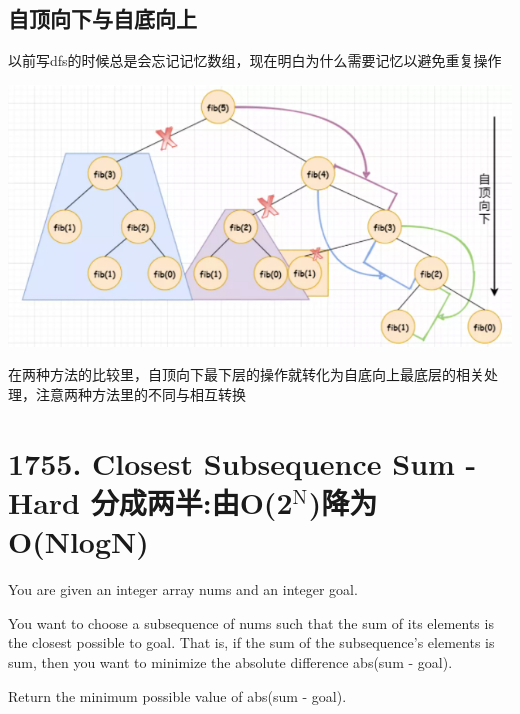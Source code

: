 \documentclass[9pt, b5paaper]{book}
\begin{document}
\subsection{自顶向下与自底向上}
\label{sec-11-14-1}
以前写dfs的时候总是会忘记记忆数组，现在明白为什么需要记忆以避免重复操作

\includegraphics[width=.9\linewidth]{./pic/topDownfib.png}

在两种方法的比较里，自顶向下最下层的操作就转化为自底向上最底层的相关处理，注意两种方法里的不同与相互转换

\section{1755. Closest Subsequence Sum - Hard 分成两半:由O(2$^{\text{N}}$)降为O(NlogN)}
\label{sec-11-15}
You are given an integer array nums and an integer goal.

You want to choose a subsequence of nums such that the sum of its elements is the closest possible to goal. That is, if the sum of the subsequence's elements is sum, then you want to minimize the absolute difference abs(sum - goal).

Return the minimum possible value of abs(sum - goal).
\end{document}
